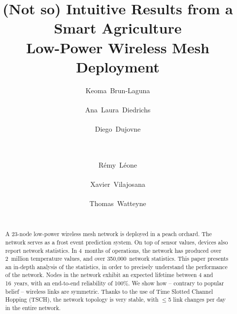 \documentclass{sig-alternate}
\begin{document}
\title{(Not so) Intuitive Results from a Smart Agriculture\\Low-Power Wireless Mesh Deployment}

\author{
    \alignauthor Keoma~Brun-Laguna\\
        \\
    \alignauthor Ana~Laura~Diedrichs\\
        \\
    \alignauthor Diego~Dujovne\\
        \\
        \\
    \and
    \alignauthor R\'emy~L\'eone\\
        \\
    \alignauthor Xavier~Vilajosana\\
        \\
    \alignauthor Thomas~Watteyne\\
        \\
}

\maketitle

\begin{abstract}
A 23-node low-power wireless mesh network is deployed in a peach orchard.
The network serves as a frost event prediction system.
On top of sensor values, devices also report network statistics.
In 4~months of operations, the network has produced over 2~million temperature values, and over 350,000~network statistics.
This paper presents an in-depth analysis of the statistics, in order to precisely understand the performance of the network.
Nodes in the network exhibit an expected lifetime between 4 and 16~years, with an end-to-end reliability of 100\%.
We show how -- contrary to popular belief -- wireless links are symmetric.
Thanks to the use of Time Slotted Channel Hopping (TSCH), the network topology is very stable, with $\leq$5 link changes per day in the entire network.
\end{abstract}
\end{document}
